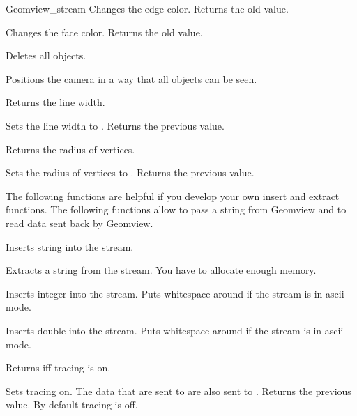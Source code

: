 \begin{ccClass}{Geomview_stream}
{Changes the edge color. Returns the old value.}


{Changes the face color. Returns the old value.}



{Deletes all objects.}

{Positions the camera in a way that all objects can be seen.}

{Returns the line width.}

{Sets the line width to . Returns the previous value.}

{Returns the radius of vertices.}

{Sets the radius of vertices to . Returns the previous value.}



\newpage
\begin{ccAdvanced}


The following functions are helpful if you develop your own insert
and extract functions. The following functions allow to pass a string
from Geomview and to read data sent back by Geomview.

{Inserts string  into the stream.}


{Extracts a string  from the stream.
\ccPrecond You have to allocate enough memory.}

{Inserts integer  into the stream. Puts whitespace around if the
stream is in ascii mode.}

{Inserts double  into the stream. Puts whitespace around if the
stream is in ascii mode.}

{Returns  iff tracing is on.}

{Sets tracing on. The data that are sent to  are also
 sent to .  Returns the previous value. By default tracing is
 off.}


\end{ccAdvanced}
\end{ccClass}
